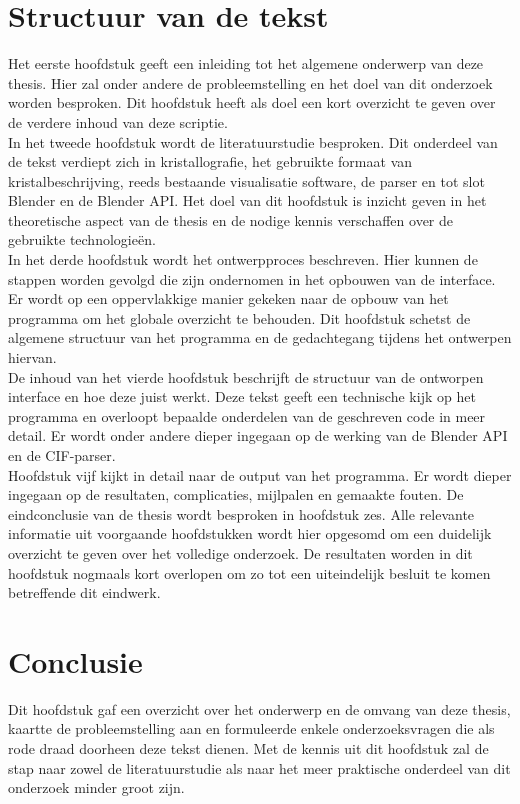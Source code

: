 \section{Structuur van de tekst}
Het eerste hoofdstuk geeft een inleiding tot het algemene onderwerp van deze thesis. Hier zal onder andere de probleemstelling en het doel van dit onderzoek worden besproken. Dit hoofdstuk heeft als doel een kort overzicht te geven over de verdere inhoud van deze scriptie.  
\\
In het tweede hoofdstuk wordt de literatuurstudie besproken. Dit onderdeel van de tekst verdiept zich in kristallografie, het gebruikte formaat van kristalbeschrijving, reeds bestaande visualisatie software, de parser en tot slot Blender en de Blender API. Het doel van dit hoofdstuk is inzicht geven in het theoretische aspect van de thesis en de nodige kennis verschaffen over de gebruikte technologieën.
\\
In het derde hoofdstuk wordt het ontwerpproces beschreven. Hier kunnen de stappen worden gevolgd die zijn ondernomen in het opbouwen van de interface. Er wordt op een oppervlakkige manier gekeken naar de opbouw van het programma om het globale overzicht te behouden. Dit hoofdstuk schetst de algemene structuur van het programma en de gedachtegang tijdens het ontwerpen hiervan.
\\
De inhoud van het vierde hoofdstuk beschrijft de structuur van de ontworpen interface en hoe deze juist werkt. Deze tekst geeft een technische kijk op het programma en overloopt bepaalde onderdelen van de geschreven code in meer detail. Er wordt onder andere dieper ingegaan op de werking van de Blender API en de CIF-parser.
\\
Hoofdstuk vijf kijkt in detail naar de output van het programma. Er wordt dieper ingegaan op de resultaten, complicaties, mijlpalen en gemaakte fouten. 
De eindconclusie van de thesis wordt besproken in hoofdstuk zes. Alle relevante informatie uit voorgaande hoofdstukken wordt hier opgesomd om een duidelijk overzicht te geven over het volledige onderzoek. De resultaten worden in dit hoofdstuk nogmaals kort overlopen om zo tot een uiteindelijk besluit te komen betreffende dit eindwerk.
\\


\section{Conclusie}
Dit hoofdstuk gaf een overzicht over het onderwerp en de omvang van deze thesis, kaartte de probleemstelling aan en formuleerde enkele onderzoeksvragen die als rode draad doorheen deze tekst dienen. Met de kennis uit dit hoofdstuk zal de stap naar zowel de literatuurstudie als naar het meer praktische onderdeel van dit onderzoek minder groot zijn.
